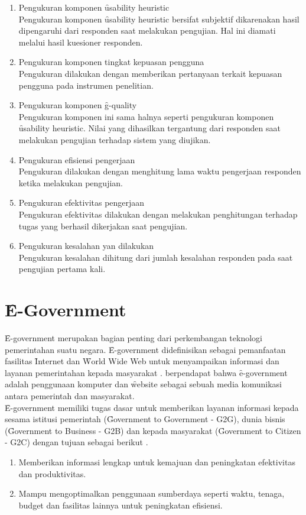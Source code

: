 \begin{enumerate}
	\item Pengukuran komponen \f{usability heuristic}\\
	Pengukuran komponen \f{usability heuristic} bersifat subjektif dikarenakan hasil dipengaruhi dari responden saat melakukan pengujian. Hal ini diamati melalui hasil kuesioner responden.
	\item Pengukuran komponen tingkat kepuasan pengguna\\
	Pengukuran dilakukan dengan memberikan pertanyaan terkait kepuasan pengguna pada instrumen penelitian.
	\item Pengukuran komponen \f{g-quality}\\
	Pengukuran komponen ini sama halnya seperti pengukuran komponen \f{usability heuristic}. Nilai yang dihasilkan tergantung dari responden saat melakukan pengujian terhadap sistem yang diujikan.
	\item Pengukuran efisiensi pengerjaan\\
	Pengukuran dilakukan dengan menghitung lama waktu pengerjaan responden ketika melakukan pengujian.  
	\item Pengukuran efektivitas pengerjaan\\
	Pengukuran efektivitas dilakukan dengan melakukan penghitungan terhadap tugas yang berhasil dikerjakan saat pengujian.
	\item Pengukuran kesalahan yan dilakukan\\
	Pengukuran kesalahan dihitung dari jumlah kesalahan responden pada saat pengujian pertama kali.
\end{enumerate}

\section{\f{E-Government}}
\f{E-government} merupakan bagian penting dari perkembangan teknologi pemerintahan suatu negara. \f{E-government} didefinisikan sebagai pemanfaatan fasilitas \f{Internet} dan \f{World Wide Web} untuk menyampaikan informasi dan layanan pemerintahan kepada masyarakat \citep{buku.un}. \citet{paper.yen} berpendapat bahwa \f{e-government} adalah penggunaan komputer dan \f{website} sebagai sebuah media komunikasi antara pemerintah dan masyarakat.
\newline\\
\f{E-government} memiliki tugas dasar untuk memberikan layanan informasi kepada sesama istitusi pemerintah (\f{Government to Government} - G2G), dunia bisnis (\f{Government to Business} - G2B) dan kepada masyarakat (\f{Government to Citizen} - G2C) dengan tujuan sebagai berikut \citep{buku.hasibua}.
\begin{enumerate}
	\item Memberikan informasi lengkap untuk kemajuan dan peningkatan efektivitas dan produktivitas.
	\item Mampu mengoptimalkan penggunaan sumberdaya seperti waktu, tenaga, budget dan fasilitas lainnya untuk peningkatan efisiensi.
\end{enumerate}
